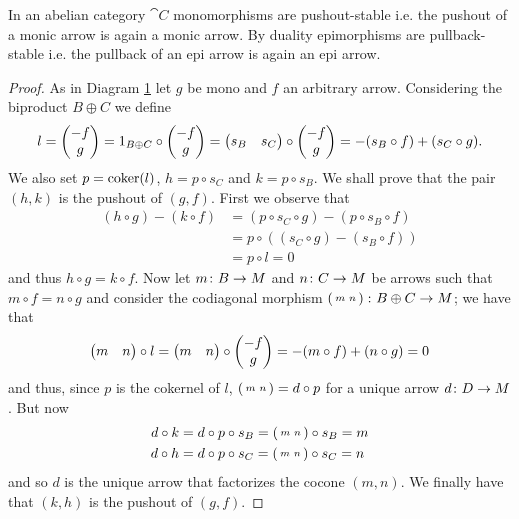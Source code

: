 \begin{proposition}
  \label{prop:pullback_of_epi}
  In an abelian category \(\cat{C}\) monomorphisms are pushout-stable i.e. the pushout of a monic arrow is again a monic arrow. By duality epimorphisms are pullback-stable i.e. the pullback of an epi arrow is again an epi arrow.
\end{proposition}

\begin{figure}
  
  \caption{}
  \label{diagram:pushepi}
\end{figure}

\begin{proof}
  As in Diagram \ref{diagram:pushepi} let \(g\) be mono and \(f\) an arbitrary arrow. Considering the biproduct \(B\oplus C\) we define
  \begin{equation*}
    l = \begin{pmatrix}-f\\ g\end{pmatrix} = 1_{B\oplus C}\circ\begin{pmatrix}-f\\ g\end{pmatrix} = \begin{pmatrix}s_B & s_C\end{pmatrix}\circ\begin{pmatrix}-f\\ g\end{pmatrix} = -(s_B\circ f) + (s_C\circ g).
  \end{equation*}
  We also set \(p = \operatorname{coker}(l)\), \(h = p\circ s_C\) and \(k = p\circ s_B\). We shall prove that the pair \((h, k)\) is the pushout of \((g, f)\). First we observe that
  \begin{align*}
    (h\circ g) - (k\circ f) &= (p\circ s_C \circ g) - (p\circ s_B\circ f)\\
                            &= p\circ((s_C\circ g) - (s_B\circ f))\\
                            &= p\circ l = 0
  \end{align*}
  and thus \(h\circ g = k\circ f\). Now let \(m\colon B\to M\) and \(n\colon C\to M\) be arrows such that \(m\circ f = n\circ g\) and consider the codiagonal morphism \(\left(\begin{smallmatrix}m & n\end{smallmatrix}\right)\colon B\oplus C\to M\); we have that
  \begin{align*}
    \begin{pmatrix}m & n\end{pmatrix}\circ l = \begin{pmatrix}m & n\end{pmatrix}\circ\begin{pmatrix}-f\\ g\end{pmatrix} = -(m\circ f) + (n\circ g) = 0
  \end{align*}
  and thus, since \(p\) is the cokernel of \(l\), \(\left(\begin{smallmatrix}m & n\end{smallmatrix}\right) = d\circ p\) for a unique arrow \(d\colon D\to M\). But now
  \begin{align*}
    d\circ k &= d\circ p\circ s_B = \left(\begin{smallmatrix}m & n\end{smallmatrix}\right)\circ s_B = m\\
    d\circ h &= d\circ p\circ s_C = \left(\begin{smallmatrix}m & n\end{smallmatrix}\right)\circ s_C = n
  \end{align*}
  and so \(d\) is the unique arrow that factorizes the cocone \((m, n)\). We finally have that \((k, h)\) is the pushout of \((g, f)\).


\end{proof}
